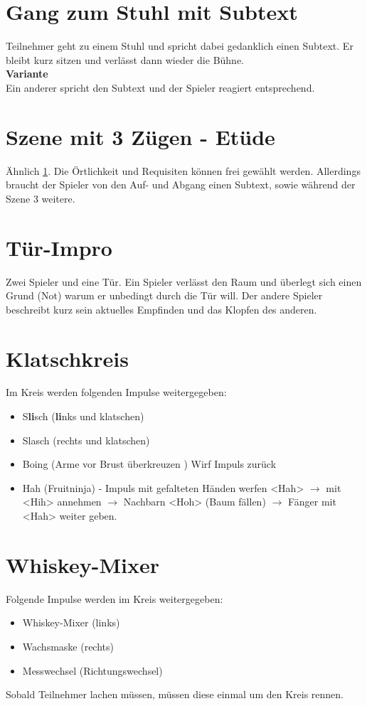 \documentclass[ngerman, a4paper, twoside]{scrbook}%
\begin{document}
	\section{Gang zum Stuhl mit Subtext}\label{Gang zum Stuhl mit Subtext}
	Teilnehmer geht zu einem Stuhl und spricht dabei gedanklich einen Subtext. Er bleibt kurz sitzen und verlässt dann wieder die Bühne. \vspace{.4cm}\\
	\textbf{Variante} \vspace{.2cm}\\
	Ein anderer spricht den Subtext und der Spieler reagiert entsprechend.
	\section{Szene mit 3 Zügen - Etüde}
	Ähnlich \ref{Gang zum Stuhl mit Subtext}. Die Örtlichkeit und Requisiten können frei gewählt werden. Allerdings braucht der Spieler von den Auf- und Abgang einen Subtext, sowie während der Szene 3 weitere.
	\section{Tür-Impro}
	Zwei Spieler und eine Tür. Ein Spieler verlässt den Raum und überlegt sich einen Grund (Not) warum er unbedingt durch die Tür will. Der andere Spieler beschreibt kurz sein aktuelles Empfinden und das Klopfen des anderen.
	\section{Klatschkreis}
	Im Kreis werden folgenden Impulse weitergegeben:
	\begin{itemize}
		\item S\textbf{li}sch (\textbf{li}nks und klatschen)
		\item Slasch (rechts und klatschen)
		\item Boing (Arme vor Brust überkreuzen ) Wirf Impuls zurück
		\item Hah (Fruitninja) - Impuls mit gefalteten Händen werfen <Hah> $\rightarrow$ mit <Hih> annehmen $\rightarrow$ Nachbarn <Hoh> (Baum fällen) $\rightarrow$ Fänger mit <Hah> weiter geben.
	\end{itemize}
	\section{Whiskey-Mixer}
	Folgende Impulse werden im Kreis weitergegeben:
	\begin{itemize}
		\item Whiskey-Mixer (links)
		\item Wachsmaske (rechts)
		\item Messwechsel (Richtungswechsel)
	\end{itemize}
	Sobald Teilnehmer lachen müssen, müssen diese einmal um den Kreis rennen.
\end{document}

